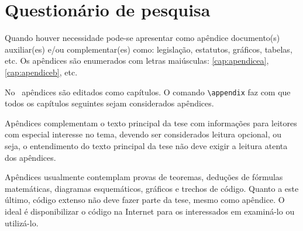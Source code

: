 
\chapter{Questionário de pesquisa}\label{cap:apendicea}

Quando houver necessidade pode-se apresentar como apêndice documento(s) auxiliar(es) e/ou complementar(es) como: legislação, estatutos, gráficos, tabelas, etc. Os apêndices são enumerados com letras maiúsculas: \autoref{cap:apendicea}, \autoref{cap:apendiceb}, etc.

No \latex\ apêndices são editados como capítulos. O comando \verb|\appendix| faz com que todos os capítulos seguintes sejam considerados apêndices.

Apêndices complementam o texto principal da tese com informações para leitores com especial interesse no tema, devendo ser considerados leitura opcional, ou seja, o entendimento do texto principal da tese não deve exigir a leitura atenta dos apêndices.

Apêndices usualmente contemplam provas de teoremas, deduções de fórmulas matemáticas, diagramas esquemáticos, gráficos e trechos de código. Quanto a este último, código extenso não deve fazer parte da tese, mesmo como apêndice. O ideal é disponibilizar o código na Internet para os interessados em examiná-lo ou utilizá-lo.




